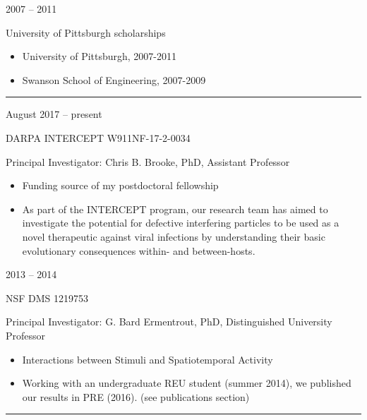 \documentclass[a4paper,10pt]{article}
\newlength{\cvcolumngapwidth}
\newlength{\cvleftcolumnwidth}
\newlength{\cvrightcolumnwidth}
\newcommand{\cvsectionstyle}[1]{{\normalsize\cvsectionfont\textcolor{cvsectioncolor}{#1}}}
\newcommand{\cvtitlestyle}[1]{{\large\cvtitlefont\textcolor{cvtitlecolor}{#1}}}
\newcommand{\cvheadingstyle}[1]{{\normalsize\cvheadingfont\textcolor{cvheadingcolor}{#1}}}
\newlength{\cvafteritemskipamount}
\newlength{\cvaftersectionskipamount}
\newlength{\cvbetweensectionandheadingextraskipamount}
\newlength{\cvaftertitleskipamount}
\newlength{\cvparskip}
\newcommand{\cvsection}[1]{
            \begin{minipage}[t]{\cvleftcolumnwidth}
                \raggedleft\cvsectionstyle{#1}
            \end{minipage}%
            \hspace{\cvcolumngapwidth}%
            \begin{minipage}[t]{\cvrightcolumnwidth}
                \textcolor{cvrulecolor}{\rule{\cvrightcolumnwidth}{0.3mm}}
            \end{minipage}
        
            \vspace{\cvaftersectionskipamount}
        }
\newcommand{\cvitem}[2]{
            \begin{minipage}[t]{\cvleftcolumnwidth}
                \raggedleft #1
            \end{minipage}%
            \hspace{\cvcolumngapwidth}%
            \begin{minipage}[t]{\cvrightcolumnwidth}
                \setlength{\parskip}{\cvparskip} #2
            \end{minipage}
        
            \vspace{\cvafteritemskipamount}
        }
\newcommand{\cvtitle}[1]{
            \cvtitlestyle{#1}
        
            \vspace{\cvaftertitleskipamount}
            \vspace{-\cvparskip}
        }
\begin{document}
        
        \cvitem{
            \cvheadingstyle{2007 -- 2011}
        }{
                \cvtitle{University of Pittsburgh scholarships} 
                \begin{itemize}[leftmargin=*]
                \item University of Pittsburgh, 2007-2011
                \item Swanson School of Engineering, 2007-2009
                \end{itemize}
        }
        
       
        \cvsection{FUNDING ACKNOWLEDGMENTS}
        \vspace{\cvbetweensectionandheadingextraskipamount}
        
        \cvitem{
            \cvheadingstyle{August 2017 -- present}
        }{
            \cvtitle{DARPA INTERCEPT W911NF-17-2-0034} 
            Principal Investigator: Chris B. Brooke, PhD, Assistant Professor
            \begin{itemize}
        	\item Funding source of my postdoctoral fellowship
            	\item As part of the INTERCEPT program, our research team has aimed to investigate the potential for defective interfering particles to be used as a novel therapeutic against viral infections by understanding their basic evolutionary consequences within- and between-hosts.
            \end{itemize}
            
        }
        
        \cvitem{
            \cvheadingstyle{2013 -- 2014}
        }{
            \cvtitle{NSF DMS 1219753} 
            Principal Investigator: G. Bard Ermentrout, PhD, Distinguished University Professor
            \begin{itemize}
                \item Interactions between Stimuli and Spatiotemporal Activity
                \item Working with an undergraduate REU student (summer 2014), we published our results in PRE (2016). (see publications section) \\
            \end{itemize}
            
        }
        
        
        \cvsection{REFERENCES}
        
\end{document}
